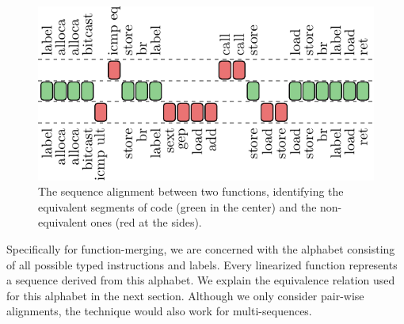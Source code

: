 \begin{figure}[t]
  \centering
  \includegraphics[width=0.75\linewidth]{figs/opcode-align.pdf}
  \caption{The sequence alignment between two functions, identifying the equivalent segments of code (green in the center) and the non-equivalent ones (red at the sides).}
  \label{fig:opcode-align}
\end{figure}

Specifically for function-merging, we are concerned with the alphabet
consisting of all possible typed instructions and labels.
Every linearized function represents a sequence derived from this alphabet.
We explain the equivalence relation used for this alphabet in the next section.
Although we only consider pair-wise alignments, the technique would also work
for multi-sequences.


